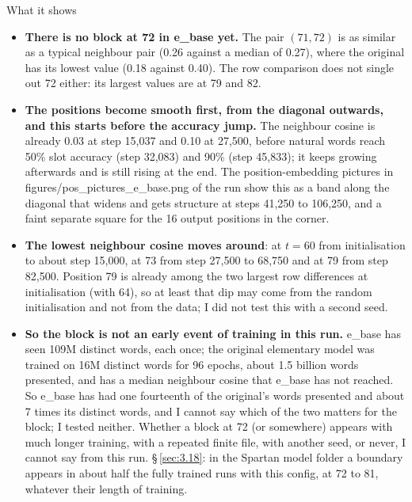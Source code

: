 \documentclass[paper=a4,fontsize=11pt,DIV=11,parskip=half,headings=small,numbers=noendperiod]{scrartcl}
\DeclareRobustCommand{\lead}[1]{\textsf{\bfseries\color{accent}#1}}
\DeclareRobustCommand{\code}[1]{{\fontseries{m}\ttfamily #1}}
\begin{document}
\begin{findbox}{What it shows}
\begin{itemize}
\item \lead{There is no block at 72 in \code{e\_\allowbreak{}base} yet.} The pair $(71,72)$ is as similar as a
  typical neighbour pair (0.26 against a median of 0.27), where the original has its lowest value (0.18 against
  0.40). The row comparison does not single out 72 either: its largest values are at 79 and 82.
\item \lead{The positions become smooth first, from the diagonal outwards, and this starts before the accuracy
  jump.} The neighbour cosine is already 0.03 at step 15,037 and 0.10 at 27,500, before natural words reach 50\%
  slot accuracy (step 32,083) and 90\% (step 45,833); it keeps growing afterwards and is still rising at the
  end. The position-embedding pictures in
  \code{figures/\allowbreak{}pos\_\allowbreak{}pictures\_\allowbreak{}e\_\allowbreak{}base.\allowbreak{}png} of
  the run show this as a band along the diagonal that widens and gets structure at steps 41,250 to 106,250, and
  a faint separate square for the 16 output positions in the corner.
\item \lead{The lowest neighbour cosine moves around}: at $t=60$ from initialisation to about step 15,000, at 73
  from step 27,500 to 68,750 and at 79 from step 82,500. Position 79 is already among the two largest row
  differences at initialisation (with 64), so at least that dip may come from the random initialisation and not
  from the data; I did not test this with a second seed.
\item \lead{So the block is not an early event of training in this run.} \code{e\_\allowbreak{}base} has seen
  109M distinct words, each once; the original elementary model was trained on 16M distinct words for 96 epochs,
  about 1.5 billion words presented, and has a median neighbour cosine that \code{e\_\allowbreak{}base} has not
  reached. So \code{e\_\allowbreak{}base} has had one fourteenth of the original’s words presented and about 7
  times its distinct words, and I cannot say which of the two matters for the block; I tested neither. Whether a
  block at 72 (or somewhere) appears with much longer training, with a repeated finite file, with another seed,
  or never, I cannot say from this run. \S\,\ref{sec:3.18}: in the Spartan model folder a boundary appears in
  about half the fully trained runs with this config, at 72 to 81, whatever their length of training.
\end{itemize}
\end{findbox}
\end{document}
